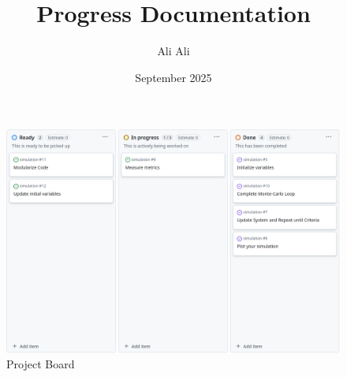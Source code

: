 \documentclass{article}
\title{Progress Documentation}
\author{Ali Ali}
\date{September 2025}
\begin{document}
\maketitle
\begin{figure}
  \includegraphics[scale=0.4]{projectboard}
  \caption{Project Board}
\end{figure}
\end{document}
